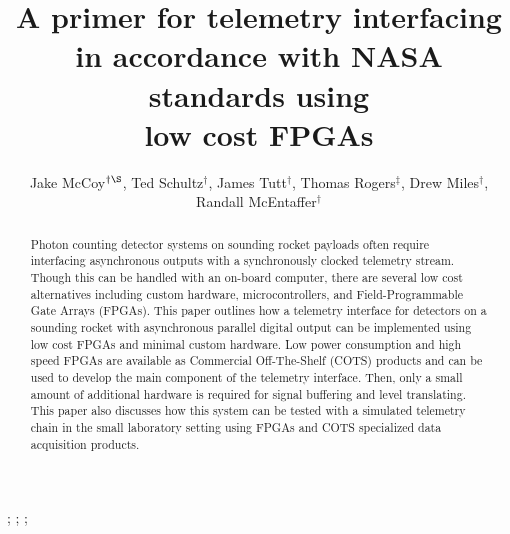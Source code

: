 \documentclass{ws-jai}
\begin{document}
\catchline{}{}{}{}{} %


\title{A primer for telemetry interfacing in accordance with NASA standards using\\ low cost FPGAs}

\author{Jake McCoy$^{\dagger \S}$, Ted Schultz$^\dagger$, James Tutt$^\dagger$, Thomas Rogers$^\ddagger$, Drew Miles$^\dagger$,  Randall McEntaffer$^\dagger$}

\address{
$^\dagger$University of Iowa, Van Allen Hall, Iowa City, IA, USA 52242, $^\S$jake-mccoy@uiowa.edu \\
$^\ddagger$University of Colorado, Center for Astrophysics and Space Astronomy, Boulder, CO, USA 80303
}

\maketitle


\begin{history}
;
;
;
\end{history}

\begin{abstract}
Photon counting detector systems on sounding rocket payloads often require interfacing asynchronous outputs with a synchronously clocked telemetry stream. Though this can be handled with an on-board computer, there are several low cost alternatives including custom hardware, microcontrollers, and Field-Programmable Gate Arrays (FPGAs). 
This paper outlines how a telemetry interface for detectors on a sounding rocket with asynchronous parallel digital output can be implemented using low cost FPGAs and minimal custom hardware. 
Low power consumption and high speed FPGAs are available as Commercial Off-The-Shelf (COTS) products and can be used to develop the main component of the telemetry interface. Then, only a small amount of additional hardware is required for signal buffering and level translating. 
This paper also discusses how this system can be tested with a simulated telemetry chain in the small laboratory setting using FPGAs and COTS specialized data acquisition products.

\end{abstract}
\end{document}

